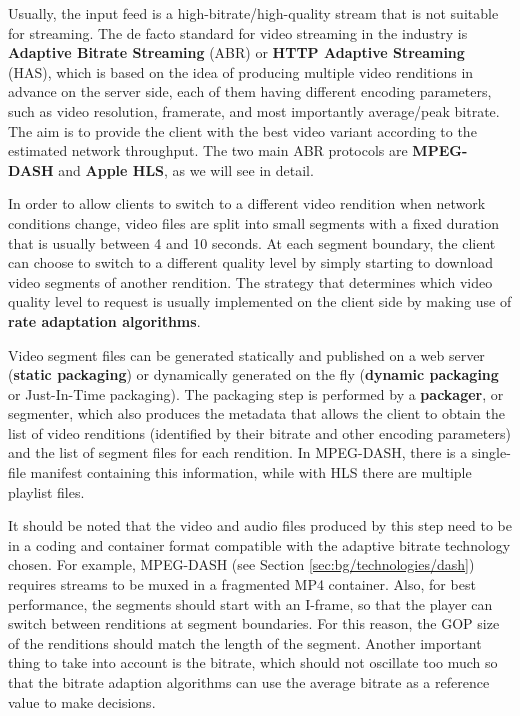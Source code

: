Usually, the input feed is a high-bitrate/high-quality stream that is not suitable for streaming. The de facto standard for video streaming in the industry is \textbf{Adaptive Bitrate Streaming} (ABR) or \textbf{HTTP Adaptive Streaming} (HAS), which is based on the idea of producing multiple video renditions in advance on the server side, each of them having different encoding parameters, such as video resolution, framerate, and most importantly average/peak bitrate. The aim is to provide the client with the best video variant according to the estimated network throughput. The two main ABR protocols are \textbf{MPEG-DASH} and \textbf{Apple HLS}, as we will see in detail.

In order to allow clients to switch to a different video rendition when network conditions change, video files are split into small segments with a fixed duration that is usually between 4 and 10 seconds. At each segment boundary, the client can choose to switch to a different quality level by simply starting to download video segments of another rendition. The strategy that determines which video quality level to request is usually implemented on the client side by making use of \textbf{rate adaptation algorithms}.

Video segment files can be generated statically and published on a web server (\textbf{static packaging}) or dynamically generated on the fly (\textbf{dynamic packaging} or Just-In-Time packaging). The packaging step is performed by a \textbf{packager}, or segmenter, which also produces the metadata that allows the client to obtain the list of video renditions (identified by their bitrate and other encoding parameters) and the list of segment files for each rendition. In MPEG-DASH, there is a single-file manifest containing this information, while with HLS there are multiple playlist files.

It should be noted that the video and audio files produced by this step need to be in a coding and container format compatible with the adaptive bitrate technology chosen. For example, MPEG-DASH (see Section \ref{sec:bg/technologies/dash}) requires streams to be muxed in a fragmented MP4 container. Also, for best performance, the segments should start with an I-frame, so that the player can switch between renditions at segment boundaries. For this reason, the GOP size of the renditions should match the length of the segment. Another important thing to take into account is the bitrate, which should not oscillate too much so that the bitrate adaption algorithms can use the average bitrate as a reference value to make decisions.\cite{ozer}

